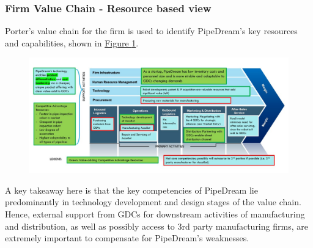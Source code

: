 \documentclass[11pt]{article}		%
\newcommand{\figref}[1]{\hyperref[#1]{Figure \ref*{#1}}}    %
\begin{document}
	\subsubsection[Firm Value Chain]{Firm Value Chain - Resource based view}
 Porter's value chain for the firm is used to identify PipeDream's key resources and capabilities, shown in \figref{valueChain}. 
 
                \begin{figure}[H]
    					\centering
        					\includegraphics[width=\textwidth]{valuechain.jpg}
        					\label{valueChain}
			    \end{figure}
 
	\hspace*{3ex} A key takeaway here is that the key competencies of PipeDream lie predominantly in technology development and design stages of the value chain. Hence, external support from GDCs for downstream activities of manufacturing and distribution, as well as possibly access to 3rd party manufacturing firms, are extremely important to compensate for PipeDream's weaknesses. 

	
\end{document}
